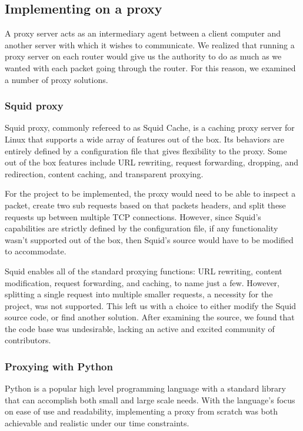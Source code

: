 \documentclass[12pt]{article}
\begin{document}
	\subsection{Implementing on a proxy}

		A proxy server acts as an intermediary agent between a client computer and another server with which it wishes to communicate. We realized that running a proxy server on each router would give us the authority to do as much as we wanted with each packet going through the router. For this reason, we examined a number of proxy solutions. 

		\subsubsection{Squid proxy}

			Squid proxy, commonly refereed to as Squid Cache, is a caching proxy server for Linux that supports a wide array of features out of the box. Its behaviors are entirely defined by a configuration file that gives flexibility to the proxy. Some out of the box features include URL rewriting, request forwarding, dropping, and redirection, content caching, and transparent proxying.

			For the project to be implemented, the proxy would need to be able to inspect a packet, create two sub requests based on that packets headers, and split these requests up between multiple TCP connections. However, since Squid's capabilities are strictly defined by the configuration file, if any functionality wasn't supported out of the box, then Squid's source would have to be modified to accommodate.

			Squid enables all of the standard proxying functions: URL rewriting, content modification, request forwarding, and caching, to name just a few. However, splitting a single request into multiple smaller requests, a necessity for the project, was not supported. This left us with a choice to either modify the Squid source code, or find another solution. After examining the source, we found that the code base was undesirable, lacking an active and excited community of contributors.

		\subsubsection{Proxying with Python}

			Python is a popular high level programming language with a standard library that can accomplish both small and large scale needs. With the language's focus on ease of use and readability, implementing a proxy from scratch was both achievable and realistic under our time constraints.
\end{document}
